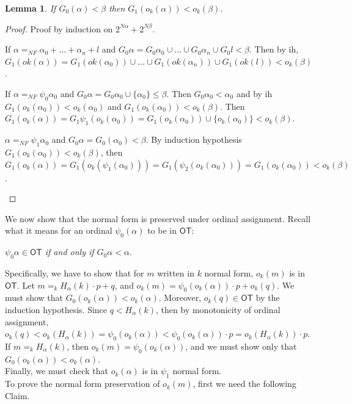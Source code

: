 \documentclass{amsart}
\theoremstyle{plain}
\theoremstyle{plain}
\newtheorem{lemma}[theorem]{Lemma}
\newcommand\OT{\mathsf{OT}}
\newcommand{\ok}{o_{k}}
\newcommand{\al}{{\alpha}}
\newcommand{\be}{{\beta}}
\begin{document}
\begin{lemma}If $G_0(\al) < \be $ then $G_1(\ok(\al)) < \ok(\be)$.
\end{lemma}
\begin{proof} Proof by induction on $2^{N\al} + 2^{N\be}$.
\begin{Cases}
    \item If $\al=_{NF} \al_0 +\ldots +\al_n +l$ and $G_0\al = G_0\al_0 \cup  \ldots  \cup G_0\al_n \cup G_0l< \be$. 
    Then by ih, $G_1(ok(\al))=  G_1(ok(\al_0)) \cup \ldots \cup G_1(ok(\al_n)) \cup G_1(ok(l))< \ok(\be)$.
    
    \item If $\al=_{NF} \psi_0\al_0$ and $G_0\al = G_0\al_0 \cup \{\al_0\} \leq \be$.
    Then $G_0\al_0 <\al_0$ and by ih $G_1(\ok(\al_0)) <\ok(\al_0)$ and $G_1(\ok(\al_0))<\ok(\be)$.
    Then $G_1(\ok(\al))= G_1\psi_1(\ok(\al_0)) = G_1(\ok(\al_0)) \cup \{\ok(\al_0)\} < \ok(\be)$.
    
    \item $\al =_{NF} \psi_1\al_0$ and $G_0\al= G_0(\al_0) < \be$. By induction hypothesis $G_1(\ok(\al_0))< \ok(\be)$, then $G_1(\ok(\al)) = G_1(\ok(\psi_1(\al_0))) = G_1(\psi_2(\ok(\al_0)))= G_1(\ok(\al_0)) < \ok(\be)$.
\end{Cases}
\end{proof}


We now show that the normal form is preserved under ordinal assignment. 
Recall what it means for an ordinal $\psi_0(\al)$ to be in $\OT$:
\begin{center}{\em $\psi_{0}\al \in \OT$ if and only if $G_0\al < \al$}.\end{center}
Specifically, we have to show that for $m$ written in $k$ normal form, $\ok(m)$ is in $\OT$.
Let $m =_k H_\al(k)\cdot p +q $, and $\ok(m)=\psi_0(\ok(\al))\cdot p + \ok(q)$. We must show that  $G_0(\ok(\al)) <  \ok(\al) $. Moreover, $\ok(q)\in \OT$ by the induction hypothesis. 
Since $q<H_{\al}(k)$, then by monotonicity of ordinal assignment, $\ok(q)<\ok(H_{\al}(k))=\psi_0(\ok(\al))<\psi_0(\ok(\al))\cdot p=\ok(H_\al(k)) \cdot p$.\\
If $m=_k H_\al(k)$, then $\ok(m) =\psi_0(\ok(\al))$, and we must show only that  $G_0(\ok(\al)) <  \ok(\al) $.\\
Finally, we must check that $\ok(\al)$ is in $\psi_1$ normal form.
\medskip\\
To prove the normal form preservation of $\ok(m)$, first we need the following Claim. 
\end{document}
